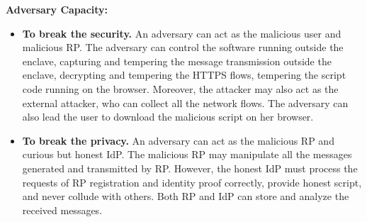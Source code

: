 \vspace{1mm}\noindent\textbf{Adversary Capacity: }
\begin{itemize}
\item \noindent\textbf{To break the security.}
An adversary can act as the malicious user and malicious RP.
The adversary can control the software running outside the enclave, capturing and tempering the message transmission outside the enclave, decrypting and tempering the HTTPS flows, tempering the script code running on the browser.
Moreover, the attacker may also act as the external attacker, who can collect all the network flows. The adversary can also lead the user to download the malicious script on her browser.

\item \noindent\textbf{To break the privacy.}
An adversary can act as the malicious RP and curious but honest IdP.
The malicious RP may manipulate  all the messages generated and transmitted by RP.
However, the honest IdP must process the requests of RP registration and identity proof correctly, provide honest script, and never collude with others.
Both RP and IdP can store and analyze the received messages.

\end{itemize}

